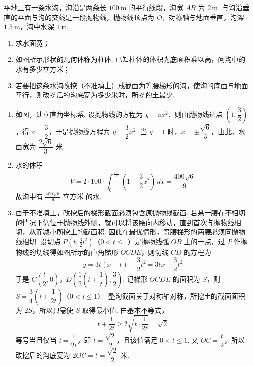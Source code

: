 \documentclass[UTF8,a4paper,oneside,11pt]{ctexbook}
\begin{document}
\begin{problem}
平地上有一条水沟，沟沿是两条长 \(100\mathrm{~m}\) 的平行线段，沟宽 \(AB\) 为 \(2\mathrm{~m}\). 与沟沿垂直的平面与沟的交线是一段抛物线，抛物线顶点为 \(O\)，对称轴与地面垂直，沟深 \(1.5\mathrm{~m}\)，沟中水深 \(1\mathrm{~m}\).

\begin{enumerate}
\item 求水面宽；
\item 如图所示形状的几何体称为柱体. 已知柱体的体积为底面积乘以高，问沟中的水有多少立方米；
\item 若要把这条水沟改挖（不准填土）成截面为等腰梯形的沟，使沟的底面与地面平行，则改挖后的沟底宽为多少米时，所挖的土最少.
\end{enumerate}

\FloatBarrier
\end{problem}

\begin{solution}
\begin{enumerate}
\item 如图，建立直角坐标系.
设抛物线的方程为 \(y=ax^2\)，则由抛物线过点 \(\left(1,\dfrac32\right)\)，得 \(a=\dfrac32\)，于是抛物线方程为 \(y=\dfrac32x^2\). 当 \(y=1\) 时，\(x=\pm\dfrac{\sqrt6}{3}\)，由此，水面宽为 \(\dfrac{2\sqrt6}{3}\text{ 米}\).

\item 水的体积
\[
V=2\cdot100\cdot\int_0^{\frac{\sqrt6}{3}}\left(1-\frac32x^2\right)\,dx
=\frac{400\sqrt6}{9}
\]
故沟中有 \(\frac{400\sqrt6}{9}\text{ 立方米}\) 的水.

\item 由于不准填土，改挖后的梯形截面必须包含原抛物线截面. 若某一腰在不相切的情况下仍位于抛物线外侧，就可以将该腰向内移动，直到首次与抛物线相切，从而减小所挖土的截面积. 因此在最优情形，等腰梯形的两腰必须同抛物线相切.
设切点 \(P\left(t,\frac32t^2\right)\)（\(0<t\le1\)）是抛物线弧 \(OB\) 上的一点，过 \(P\) 作抛物线的切线得如图所示的直角梯形 \(OCDE\)，则切线 \(CD\) 的方程为
\[
y=3t(x-t)+\frac32t^2=3tx-\frac32t^2
\]
于是 \(C\left(\dfrac{t}{2},0\right)\)，\(D\left(\dfrac12\left(t+\dfrac1t\right),\dfrac32\right)\).
记梯形 \(OCDE\) 的面积为 \(S\)，则 \(S=\dfrac34\left(t+\dfrac1{2t}\right)\)（\(0<t\le1\)）.
整沟截面关于对称轴对称，所挖土的截面面积为 \(2S\)，所以只需使 \(S\) 取得最小值. 由基本不等式，
\[
t+\frac{1}{2t}\ge 2\sqrt{t\cdot\frac{1}{2t}}=\sqrt2
\]
等号当且仅当 \(t=\dfrac{1}{2t}\)，即 \(t=\dfrac{\sqrt2}{2}\)，且该值满足 \(0<t\le1\). 又 \(OC=\dfrac{t}{2}\)，所以改挖后的沟底宽为 \(2OC=t=\dfrac{\sqrt2}{2}\text{ 米}\).
\end{enumerate}
\end{solution}
\end{document}
